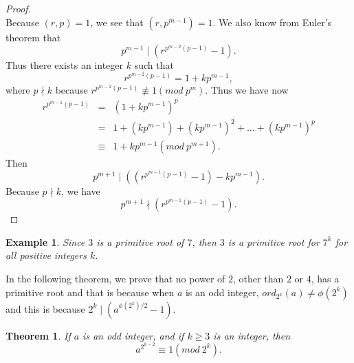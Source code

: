 \documentclass[12pt,letterpaper]{book}
\newtheorem{theorem}{Theorem}
\newtheorem{example}{Example}
\begin{document}
\begin{proof}
\begin{equation*}
\end{equation*}
Because $(r,p)=1$, we see that $(r,p^{m-1})=1$.  We also know from
Euler's theorem that
\begin{equation*}
p^{m-1}\mid (r^{p^{m-2}(p-1)}-1).
\end{equation*}
Thus there exists an integer $k$ such that
\begin{equation*}
r^{p^{m-2}(p-1)}=1+kp^{m-1},
\end{equation*}
where $p\nmid k$ because $r^{p^{m-2}(p-1)}\not\equiv 1(mod \ p^m)$.
Thus we have now
\begin{eqnarray*}
r^{p^{m-1}(p-1)}&=&(1+kp^{m-1})^p\\&=&%
1+(kp^{m-1})+(kp^{m-1})^2+\ldots +(kp^{m-1})^p\\%
&\equiv&1+kp^{m-1}(mod \ p^{m+1}).
\end{eqnarray*}
Then 
\begin{equation*}
p^{m+1}\mid ((r^{p^{m-1}(p-1)}-1)-kp^{m-1}).
\end{equation*}
Because $p\nmid k$, we have
\begin{equation*}
p^{m+1}\nmid (r^{p^{m-1}(p-1)}-1).
\end{equation*}
\end{proof}

\begin{example}
Since $3$ is a primitive root of $7$, then $3$ is a primitive root for
$7^k$ for all positive integers $k$.
\end{example}


\par In the following theorem, we prove that no power of $2$, other
than $2$ or $4$, has a primitive root and that is because when $a$ is an
odd integer, $ord_{2^k}(a)\neq \phi(2^k)$ and this is because $2^k\mid
(a^{\phi(2^k)/2}-1)$.

\begin{theorem}
If $a$ is an odd integer, and if $k\geq 3$ is an integer, then
\begin{equation*}
a^{2^{k-2}}\equiv 1(mod \ 2^k).
\end{equation*}
\end{theorem}
\end{document}
